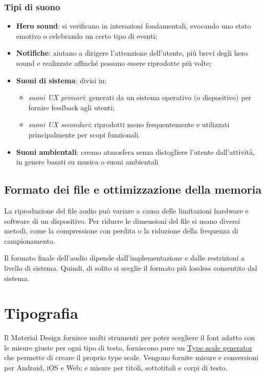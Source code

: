 \documentclass[12pt, a4paper]{report}
\begin{document}
              \subsubsection{Tipi di suono}
				\begin{itemize}
					\item \textbf{Hero sound}: si verificano in interazioni fondamentali, evocando uno stato emotivo o celebrando un certo tipo di eventi;
					\item \textbf{Notifiche}: aiutano a dirigere l'attenzione dell'utente, più brevi degli hero sound e realizzate affinché possano essere riprodotte più volte;
					\item \textbf{Suoni di sistema}: divisi in:
					\begin{itemize}
						\item \textit{suoni UX primari}: generati da un sistema operativo (o dispositivo) per fornire feedback agli utenti;
						\item \textit{suoni UX secondari}: riprodotti meno frequentemente e utilizzati principalmente per scopi	funzionali.
					\end{itemize}
					\item \textbf{Suoni ambientali}: creano atmosfera senza distogliere l'utente dall'attività, in genere basati su musica o suoni ambientali
				\end{itemize}

				\subsection{Formato dei file e ottimizzazione della memoria}
				La riproduzione del file audio può variare a causa delle limitazioni hardware e software di un dispositivo. Per ridurre le dimensioni del file si usano diversi metodi,
				come la compressione con perdita o la riduzione della frequenza di campionamento.

				Il formato finale dell'audio dipende dall'implementazione e dalle restrizioni a livello di sistema. Quindi, di solito si sceglie il formato più lossless consentito dal sistema.



	\section{Tipografia}
		Il Material Design fornisce molti strumenti per poter scegliere il font adatto con le misure giuste per ogni tipo di testo, forniscono pure un \href{https://material.io/design/typography/the-type-system.html#type-scale}{Type scale generator} che permette di creare il proprio type scale.
		Vengono fornite misure e conversioni per Android, iOS e Web; e misure per titoli, sottotitoli e corpi di testo.
\end{document}
